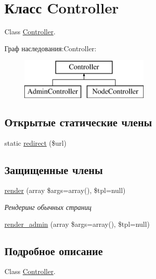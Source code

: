 \hypertarget{class_controller}{\section{Класс Controller}
\label{class_controller}
}


Class \hyperlink{class_controller}{Controller}.  


Граф наследования\-:Controller\-:\begin{figure}[H]
\begin{center}
\leavevmode
\includegraphics[height=2.000000cm]{class_controller}
\end{center}
\end{figure}
\subsection*{Открытые статические члены}
\begin{DoxyCompactItemize}
\item 
static \hyperlink{class_controller_a4c9227317bc5a987371b5eb4407f75e1}{redirect} (\$url)
\end{DoxyCompactItemize}
\subsection*{Защищенные члены}
\begin{DoxyCompactItemize}
\item 
\hyperlink{class_controller_a87cbafbc85f49bc8864557e1ffe0c143}{render} (array \$args=array(), \$tpl=null)
\begin{DoxyCompactList}\small\item\em Рендеринг обычных страниц \end{DoxyCompactList}\item 
\hyperlink{class_controller_a97e0e46d82368469d174861ca29f2001}{render\-\_\-admin} (array \$args=array(), \$tpl=null)
\end{DoxyCompactItemize}


\subsection{Подробное описание}
Class \hyperlink{class_controller}{Controller}. 

